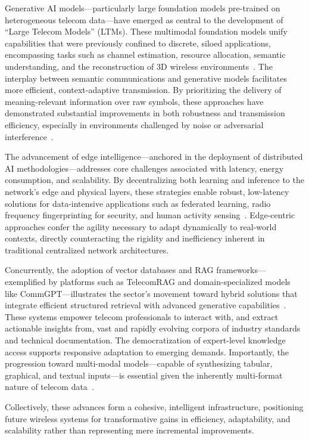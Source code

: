 Generative AI models—particularly large foundation models pre-trained on heterogeneous telecom data—have emerged as central to the development of ``Large Telecom Models'' (LTMs). These multimodal foundation models unify capabilities that were previously confined to discrete, siloed applications, encompassing tasks such as channel estimation, resource allocation, semantic understanding, and the reconstruction of 3D wireless environments~\cite{ref24}. The interplay between semantic communications and generative models facilitates more efficient, context-adaptive transmission. By prioritizing the delivery of meaning-relevant information over raw symbols, these approaches have demonstrated substantial improvements in both robustness and transmission efficiency, especially in environments challenged by noise or adversarial interference~\cite{ref20,ref26}.

The advancement of edge intelligence—anchored in the deployment of distributed AI methodologies—addresses core challenges associated with latency, energy consumption, and scalability. By decentralizing both learning and inference to the network's edge and physical layers, these strategies enable robust, low-latency solutions for data-intensive applications such as federated learning, radio frequency fingerprinting for security, and human activity sensing~\cite{ref12,ref14,ref19,ref21,ref25}. Edge-centric approaches confer the agility necessary to adapt dynamically to real-world contexts, directly counteracting the rigidity and inefficiency inherent in traditional centralized network architectures.

Concurrently, the adoption of vector databases and RAG frameworks—exemplified by platforms such as TelecomRAG and domain-specialized models like CommGPT—illustrates the sector's movement toward hybrid solutions that integrate efficient structured retrieval with advanced generative capabilities~\cite{ref11,ref22,ref23,ref29}. These systems empower telecom professionals to interact with, and extract actionable insights from, vast and rapidly evolving corpora of industry standards and technical documentation. The democratization of expert-level knowledge access supports responsive adaptation to emerging demands. Importantly, the progression toward multi-modal models—capable of synthesizing tabular, graphical, and textual inputs—is essential given the inherently multi-format nature of telecom data~\cite{ref21,ref29}.

Collectively, these advances form a cohesive, intelligent infrastructure, positioning future wireless systems for transformative gains in efficiency, adaptability, and scalability rather than representing mere incremental improvements.

